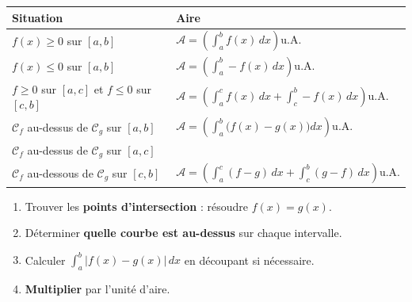 \begin{propriete}
  \bigskip
  \begin{center}
  \renewcommand{\arraystretch}{2.2}
  \begin{tabular}{|p{6cm}|p{6.5cm}|}
    \hline
    \textbf{\color{navy}Situation}
      & \textbf{\color{navy}Aire} \\
    \hline\hline
    $f(x) \geq 0$ sur $[a,b]$
      & $\mathcal{A} = \left(\displaystyle\int_a^b f(x)\,dx\right)\text{u.A.}$ \\
    \hline
    $f(x) \leq 0$ sur $[a,b]$
      & $\mathcal{A} = \left(\displaystyle\int_a^b -f(x)\,dx\right)\text{u.A.}$ \\
    \hline
    $f \geq 0$ sur $[a,c]$ et $f \leq 0$ sur $[c,b]$
      & $\mathcal{A} = \left(\displaystyle\int_a^c f(x)\,dx
        + \int_c^b -f(x)\,dx\right)\text{u.A.}$ \\
    \hline
    $\mathcal{C}_f$ au-dessus de $\mathcal{C}_g$ sur $[a,b]$
      & $\mathcal{A} = \left(\displaystyle\int_a^b
        \bigl(f(x)-g(x)\bigr)dx\right)\text{u.A.}$ \\
    \hline
    $\mathcal{C}_f$ au-dessus de $\mathcal{C}_g$ sur $[a,c]$\\
    $\mathcal{C}_f$ au-dessous de $\mathcal{C}_g$ sur $[c,b]$
      & $\mathcal{A} = \left(\displaystyle\int_a^c(f-g)\,dx
        + \int_c^b(g-f)\,dx\right)\text{u.A.}$ \\
    \hline
  \end{tabular}
  \end{center}
\end{propriete}

\begin{methode}
  \begin{enumerate}
    \item Trouver les \textbf{points d'intersection} : r\'{e}soudre $f(x) = g(x)$.
    \item D\'{e}terminer \textbf{quelle courbe est au-dessus} sur chaque intervalle.
    \item Calculer $\displaystyle\int_a^b |f(x) - g(x)|\,dx$
          en d\'{e}coupant si n\'{e}cessaire.
    \item \textbf{Multiplier} par l'unit\'{e} d'aire.
  \end{enumerate}
\end{methode}

